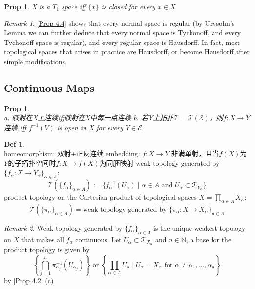 \documentclass[hidelinks]{article}
\theoremstyle{definition}
\newtheorem*{defin}{Def}
\theoremstyle{plain}
\newtheorem{proposition}[theorem]{Prop}
\theoremstyle{remark}
\newtheorem*{remark}{Remark}
\begin{document}
\begin{proposition} \label{Prop 4.4}
X is a $T_1$ space iff $\{x\}$ is closed for every $x\in X$
\end{proposition}

\begin{remark}
\autoref{Prop 4.4} shows that every normal space is regular (by Urysohn's Lemma we can further deduce that every normal space is Tychonoff, and every Tychonoff space is regular), and every regular space is Hausdorff. In fact, most topological spaces that arises in practice are Hausdorff, or become Hausdorff after simple modifications.
\end{remark}



\subsection{Continuous Maps}
\begin{proposition}~\\
a. 映射在X上连续iff映射在X中每一点连续 \newline
b. 若Y上拓扑$\mathscr{T}=\mathscr{T}(\mathscr{E})$，则$f:X\to Y$连续 iff $f^{-1}(V)$ is open in X for every $V\in \mathscr{E}$
\end{proposition}

\begin{defin}~\\
homeomorphism: 双射+正反连续 \newline
embedding: $f:X\to Y$ 非满单射，且当$f(X)$为$Y$的子拓扑空间时$f:X\to f(X)$为同胚映射 \newline
weak topology generated by $\{f_\alpha:X\to Y_\alpha\}_{\alpha \in A}$:
\[
\mathscr{T}(\{f_\alpha\}_{\alpha \in A}):=\{f^{-1}_\alpha(U_\alpha)\mid \alpha \in A \textrm{ and } U_\alpha \subset \mathscr{T}_{Y_\alpha}\}
\]
product topology on the Cartesian product of topological spaces $X=\prod_{\alpha \in A}X_\alpha$:
\[ \mathscr{T}(\{\pi_\alpha\}_{\alpha \in A})=\textrm{weak topology generated by }\{\pi_\alpha:X \to X_\alpha\}_{\alpha \in A}
\]
\end{defin}

\begin{remark}
Weak topology generated by $\{f_\alpha\}_{\alpha \in A}$ is the unique weakest topology on $X$ that makes all $f_\alpha$ continuous. Let $U_\alpha \subset \mathscr{T}_{X_\alpha}$ and $n\in \mathbb{N}$, a base for the product topology is given by
\[
\left\{\bigcap_{j=1}^{n}\pi^{-1}_{\alpha_j}(U_{\alpha_j})\right\} \textrm{ or } \left\{\prod_{\alpha \in A}U_\alpha \mid U_\alpha=X_\alpha \textrm{ for } \alpha \neq \alpha_1,...,\alpha_n\right\} 
\]
by \autoref{Prop 4.2} (c)
\end{remark}
\end{document}
